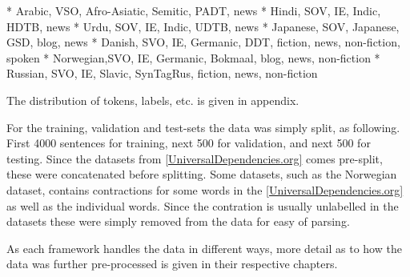 * Arabic,   VSO, Afro-Asiatic, Semitic, PADT, news
* Hindi,    SOV, IE, Indic,             HDTB, news
* Urdu,     SOV, IE, Indic,             UDTB, news
* Japanese, SOV, Japanese,              GSD, blog, news
* Danish,   SVO, IE, Germanic,          DDT, fiction, news, non-fiction, spoken
* Norwegian,SVO, IE, Germanic,          Bokmaal, blog, news, non-fiction
* Russian,  SVO, IE, Slavic,            SynTagRus, fiction, news, non-fiction

The distribution of tokens, labels, etc. is given in appendix.

For the training, validation and test-sets the data was simply split, as following. 
First 4000 sentences for training, next 500 for validation, and next 500 for testing.
Since the datasets from \ref{UniversalDependencies.org} comes pre-split, these were concatenated before splitting.
Some datasets, such as the Norwegian dataset, contains contractions for some words in the \ref{UniversalDependencies.org} as well as the individual words.
Since the contration is usually unlabelled in the datasets these were simply removed from the data for easy of parsing.

As each framework handles the data in different ways, more detail as to how the data was further pre-processed is given in their respective chapters.